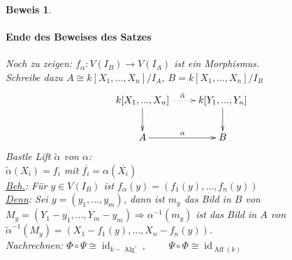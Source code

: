 \documentclass[a4paper,12pt]{report}
\theoremstyle{break}
\theoremstyle{nonumberbreak}
\theoremstyle{nonumberplain}
\newtheorem{Bew}{Beweis}
\begin{document}
\begin{Bew}
\paragraph{Ende des Beweises des Satzes}
Noch zu zeigen: $f_{\alpha}: V(I_B) \rightarrow V(I_A)$ ist ein Morphismus.\\
Schreibe dazu $A\cong k[X_1,...,X_n]/I_A$, $B=k[X_1,...,X_n]/I_B$
\[
\begin{xy}
\xymatrix{
k[X_1,...,X_n]\ar@{.>}[r]^{\tilde{\alpha}}\ar[d]&k[Y_1,...,Y_n]\ar[d] \\
A\ar[r]^{\alpha}&B
}
\end{xy}
\]
Bastle Lift $\tilde{\alpha}$ von $\alpha$:\\
$\tilde{\alpha}(X_i)=f_i$ mit $\overline{f_i}=\alpha(\overline{X_i})$\\
\underline{Beh.}: Für $y\in V(I_B)$ ist $f_{\alpha}(y)=(f_1(y),...,f_n(y))$\\
\underline{Denn}: Sei $y=(y_1,...,y_m)$, dann ist $m_y$ das Bild in $B$ von $M_y=(Y_1-y_1,...,Y_m-y_m)\Rightarrow \alpha^{-1}(m_y)$ ist das Bild in $A$ von $\tilde{\alpha}^{-1}(M_y)= (X_1-f_1(y),...,X_n-f_n(y))$.\\
Nachrechnen: $\Phi\circ\Psi\cong\operatorname{id}_{\underline{k-\operatorname{Alg}^{\circ}}}$, ~~~~$\Psi\circ\Phi\cong\operatorname{id}_{\underline{\operatorname{Aff}}(k)}$
\end{Bew}
\end{document}
